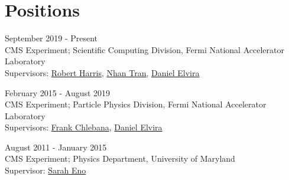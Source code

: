 \section{Positions}
\begin{description}[leftmargin=12pt,font=\normalfont\textit]
\item[Associate Scientist] \hfill September 2019 - Present\\
CMS Experiment; Scientific Computing Division, Fermi National Accelerator Laboratory \\
Supervisors: \href{mailto:rharris@fnal.gov}{Robert Harris}, \href{mailto:ntran@fnal.gov}{Nhan Tran}, \href{mailto:daniel@fnal.gov}{Daniel Elvira}
\item[Postdoctoral Research Associate] \hfill February 2015 - August 2019 \\
CMS Experiment; Particle Physics Division, Fermi National Accelerator Laboratory \\
Supervisors: \href{mailto:chlebana@fnal.gov}{Frank Chlebana}, \href{mailto:daniel@fnal.gov}{Daniel Elvira}
\item[Graduate Research Assistant] \hfill August 2011 - January 2015 \\
CMS Experiment; Physics Department, University of Maryland \\
Supervisor: \href{mailto:eno@umd.edu}{Sarah Eno}
\end{description}
